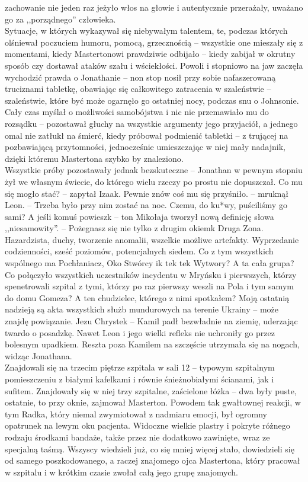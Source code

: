 \documentclass[../MAIN.tex]{subfiles}
\begin{document}
zachowanie nie jeden raz jeżyło włos na głowie i autentycznie przerażały, uważano go za ,,porządnego'' człowieka.\\
Sytuacje, w których wykazywał się niebywałym talentem, te, podczas których olśniewał poczuciem humoru, pomocą, grzecznością -- wszystkie one mieszały się z momentami, kiedy Mastertonowi prawdziwie odbijało -- kiedy zabijał w okrutny sposób czy dostawał ataków szału i wściekłości. Powoli i stopniowo na jaw zaczęła wychodzić prawda o Jonathanie -- non stop nosił przy sobie nafaszerowaną truciznami tabletkę, obawiając się całkowitego zatracenia w szaleństwie -- szaleństwie, które być może ogarnęło go ostatniej nocy, podczas snu o Johnsonie.\\
Cały czas myślał o możliwości samobójstwa i nic nie przemawiało mu do rozsądku -- pozostawał głuchy na wszystkie argumenty jego przyjaciół, a jednego omal nie zatłukł na śmierć, kiedy próbował podmienić tabletki -- z trującej na pozbawiającą przytomności, jednocześnie umieszczając w niej mały nadajnik, dzięki któremu Mastertona szybko by znaleziono.\\
Wszystkie próby pozostawały jednak bezskuteczne -- Jonathan w pewnym stopniu żył we własnym świecie, do którego wielu rzeczy po prostu nie dopuszczał.
\sx Co mu się mogło stać? -- zapytał Izaak.
\xx Pewnie znów coś mu się przyśniło. -- mruknął Leon. -- Trzeba było przy nim zostać na noc. Czemu, do ku*wy, puściliśmy go sami?
\xx A jeśli komuś powiesz\3k -- ton Mikołaja tworzył nową definicję słowa ,,niesamowity''. -- Pożegnasz się nie tylko z drugim okiem\3k
\qd
{}
Druga Zona.\\
Hazardzista, duchy, tworzenie anomalii, wszelkie możliwe artefakty.
Wyprzedanie codzienności, sześć poziomów, potencjalnych siedem. Co z tym wszystkich wspólnego ma Pochłaniacz, Oko Stwórcy i\3k te\3k te\3k Wytwory? A ta cała grupa? Co połączyło wszystkich uczestników incydentu w Mryńsku i pierwszych, którzy spenetrowali szpital z tymi, którzy po raz pierwszy weszli na Pola i tym samym do domu Gomeza? A ten chudzielec, którego z nimi spotkałem? Moją ostatnią nadzieją są akta wszystkich służb mundurowych na terenie Ukrainy -- może znajdę powiązanie.
% 
% 
\sx Jezu Chryste\3k -- Kamil padł bezwładnie na ziemię, uderzając twardo o posadzkę.
\qd
Nawet Leon i jego wielki refleks nie uchroniły go przez bolesnym upadkiem. Reszta poza Kamilem na szczęście utrzymała się na nogach, widząc Jonathana.\\
Znajdowali się na trzecim piętrze szpitala w sali 12 -- typowym szpitalnym pomieszczeniu z białymi kafelkami i równie śnieżnobiałymi ścianami, jak i sufitem. Znajdowały się w niej trzy szpitalne, zaścielone łóżka -- dwa były puste, ostatnie, to przy oknie, zajmował Masterton. Powodem tak gwałtownej reakcji, w tym Radka, który niemal zwymiotował z nadmiaru emocji, był ogromny opatrunek na lewym oku pacjenta. Widoczne wielkie plastry i pokryte różnego rodzaju środkami bandaże, także przez nie dodatkowo zawinięte, wraz ze specjalną taśmą. Wszyscy wiedzieli już, co się mniej więcej stało, dowiedzieli się od samego poszkodowanego, a raczej znajomego ojca Mastertona, który pracował w szpitalu i w krótkim czasie zwołał całą jego grupę znajomych.\\
\end{document}
